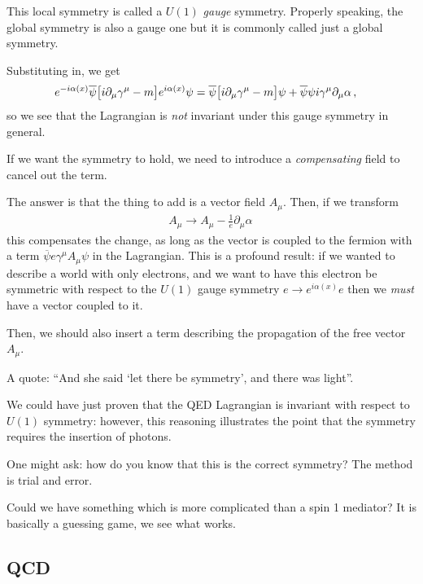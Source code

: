 \documentclass[main.tex]{subfiles}
\begin{document}
This local symmetry is called a \(U(1)\) \emph{gauge} symmetry. 
Properly speaking, the global symmetry is also a gauge one but it is commonly called just a global symmetry. 

Substituting in, we get 
%
\begin{align}
e^{-i \alpha (x)} \overline{\psi} \qty[i \partial_{\mu } \gamma^{\mu } - m] e^{i \alpha (x)} \psi  
&= 
\overline{\psi} \qty[i \partial_{\mu } \gamma^{\mu } - m] \psi  
 + \overline{\psi} \psi i \gamma^{\mu }\partial_{\mu } \alpha 
\,,
\end{align}
%
so we see that the Lagrangian is \emph{not} invariant under this gauge symmetry in general. 

If we want the symmetry to hold, we need to introduce a \emph{compensating} field to cancel out the term.

The answer is that the thing to add is a vector field \(A_{\mu }\). 
Then, if we transform 
%
\begin{align}
A_{\mu } \to A_{\mu } - \frac{1}{e} \partial_{\mu } \alpha 
\,
\end{align}
%
this compensates the change, as long as the vector is coupled to the fermion with a term \(\overline{\psi} e \gamma^{\mu } A_{\mu } \psi \) in the Lagrangian. 
This is a profound result: if we wanted to describe a world with only electrons, and we want to have this electron be symmetric with respect to the \(U(1)\) gauge symmetry \(e \to e^{i \alpha (x)} e\) then we \emph{must} have a vector coupled to it. 

Then, we should also insert a term describing the propagation of the free vector \(A_{\mu }\). 

A quote: ``And she said `let there be symmetry', and there was light''.

We could have just proven that the QED Lagrangian is invariant with respect to \(U(1)\) symmetry: however, this reasoning illustrates the point that the symmetry requires the insertion of photons. 

One might ask: how do you know that this is the correct symmetry? 
The method is trial and error. 

Could we have something which is more complicated than a spin 1 mediator? It is basically a guessing game, we see what works. 

\subsection{QCD}
\end{document}
